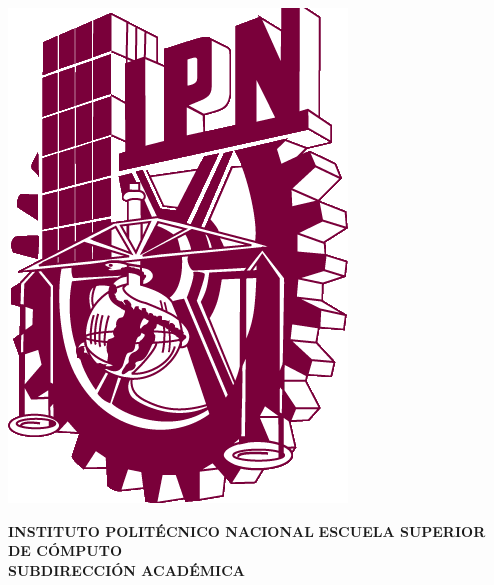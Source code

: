 
\thispagestyle{empty}	%

\begin{minipage}{.125\linewidth}	%
\includegraphics[scale=0.25]{./Figuras/Portada/IPN}
\end{minipage}
\hfill
\begin{minipage}{.6\linewidth}	%
\begin{center}
{\selectfont 	%

\textbf{\large INSTITUTO POLITÉCNICO NACIONAL}
\textbf{\large ESCUELA SUPERIOR DE CÓMPUTO}\\
\textbf{\large SUBDIRECCIÓN ACADÉMICA}\\

}
\end{center}
\end{minipage}
\hfill
